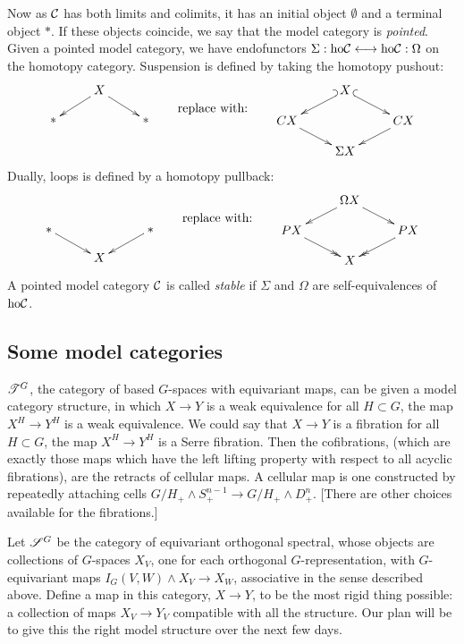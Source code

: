 \documentclass[11pt]{article}
\begin{document}
\begin{FifthWeek}
Now as $\mathcal{C}$ has both limits and colimits, it has an initial object $\emptyset$ and a terminal object $*$. If these objects coincide, we say that the model category is \emph{pointed}. Given a pointed model category, we have endofunctors $\Sigma:\textup{ho}\mathcal{C}\longleftrightarrow\textup{ho}\mathcal{C}:\Omega$ on the homotopy category. Suspension is defined by taking the homotopy pushout:
\[\xymatrix@R=.4cm{
&X\ar[dr]\ar[dl]\\
\ast&&\ast
}
\qquad\raisebox{-.5cm}{replace with:}\qquad
\xymatrix@R=.4cm{
&X\ar@{^{(}->}[dr]\ar@{_{(}->}[dl]\\
CX\ar[dr]&&CX\ar[dl]\\
&\Sigma X
}\]
Dually, loops is defined by a homotopy pullback:
\[\xymatrix@R=.4cm{
&\text{$\phantom{\Omega X}$}\\
\ast\ar[dr]&&\ast\ar[dl]\\
&X
}
\qquad\raisebox{-.5cm}{replace with:}\qquad
\xymatrix@R=.4cm{
&\Omega X\ar[dr]\ar[dl]\\
PX\ar@{->>}[dr]&&PX\ar@{->>}[dl]\\
&X
}\]
A pointed model category $\mathcal{C}$ is called \emph{stable} if $\Sigma$ and $\Omega$ are self-equivalences of $\textup{ho}\mathcal{C}$.
\subsection*{Some model categories}
$\mathscr{T}^G$, the category of based $G$-spaces with equivariant maps, can be given a model category structure, in which $X\to Y$ is a weak equivalence \Iff for all $H\subset G$, the map $X^H\to Y^H$ is a weak equivalence. We could say that $X\to Y$ is a fibration \Iff  for all $H\subset G$, the map $X^H\to Y^H$ is a Serre fibration. Then the cofibrations, (which are exactly those maps which have the left lifting property with respect to all acyclic fibrations), are the retracts of cellular maps. A cellular map is one constructed by repeatedly attaching cells $G/H_+\wedge S_+^{n-1}\to G/H_+\wedge D_+^{n}$. [There are other choices available for the fibrations.]

Let $\mathscr{S}^G$ be the category of equivariant orthogonal spectral, whose objects are collections of $G$-spaces $X_V$, one for each orthogonal $G$-representation, with $G$-equivariant maps $I_G(V,W)\wedge X_V\to X_W$, associative in the sense described above. Define a map in this category, $X\to Y$, to be the most rigid thing possible: a collection of maps $X_V\to Y_V$ compatible with all the structure. Our plan will be to give this the right model structure over the next few days.


\end{FifthWeek}
\end{document}
